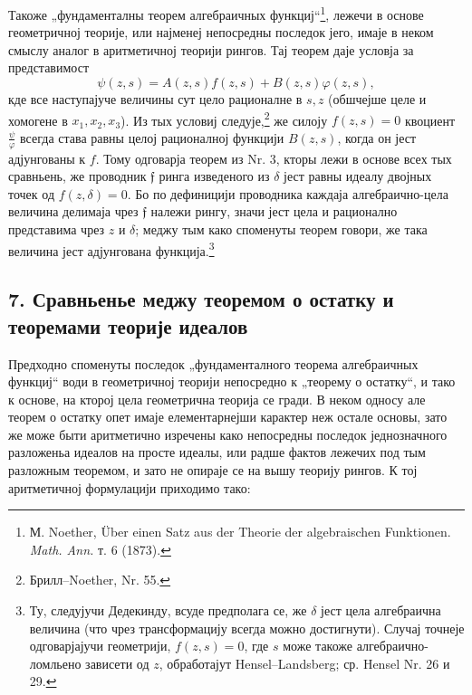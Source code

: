 ﻿\documentclass[11pt]{article}
\providecommand{\frf}{\mathfrak f}
\begin{document}
Такоже „фундаменталны теорем алгебраичных функциј“\footnote{М. Noether, Über einen Satz aus der Theorie der algebraischen Funktionen. \emph{Math. Ann.} т. 6 (1873).}, лежечи в основе геометричној теорије, или најменеј непосредны последок јего, имаје в неком смыслу аналог в аритметичној теорији рингов. Тај теорем даје условја за представимост
\[
\psi(z,s)=A(z,s)f(z,s)+B(z,s)\varphi(z,s),
\]
кде все наступајуче величины сут цело рационалне в \(s,z\) (обшчејше целе и хомогене в \(x_1,x_2,x_3\)). Из тых условиј следује,\footnote{Брилл--Noether, Nr. 55.} же силоју \(f(z,s)=0\) квоциент \(\frac{\psi}{\varphi}\) всегда става равны целој рационалној функцији \(B(z,s)\), когда он јест адјунгованы к \(f\). Тому одговарја теорем из Nr. 3, кторы лежи в основе всех тых сравньень, же проводник \(\frf\) ринга изведеного из \(\delta\) јест равны идеалу двојных точек од \(f(z,\delta)=0\). Бо по дефиницији проводника каждаја алгебраично-цела величина делимаја чрез \(\frf\) належи рингу, значи јест цела и рационално представима чрез \(z\) и \(\delta\); меджу тым како споменуты теорем говори, же така величина јест адјунгована функција.\footnote{Ту, следујучи Дедекинду, всуде предполага се, же \(\delta\) јест цела алгебраична величина (что чрез трансформацију всегда можно достигнути). Случај точнеје одговарјајучи геометрији, \(f(z,s)=0\), где \(s\) може такоже алгебраично-ломльено зависети од \(z\), обработајут Hensel--Landsberg; ср. Hensel Nr. 26 и 29.}

\subsection*{7. Сравньенье меджу теоремом о остатку и теоремами теорије идеалов}
Предходно споменуты последок „фундаменталного теорема алгебраичных функциј“ води в геометричној теорији непосредно к „теорему о остатку“, и тако к основе, на кторој цела геометрична теорија се гради. В неком односу але теорем о остатку опет имаје елементарнејши карактер неж остале основы, зато же може быти аритметично изречены како непосредны последок једнозначного разложеньа идеалов на просте идеалы, или радше фактов лежечих под тым разложным теоремом, и зато не опираје се на вышу теорију рингов. К тој аритметичној формулацији приходимо тако:
\end{document}
